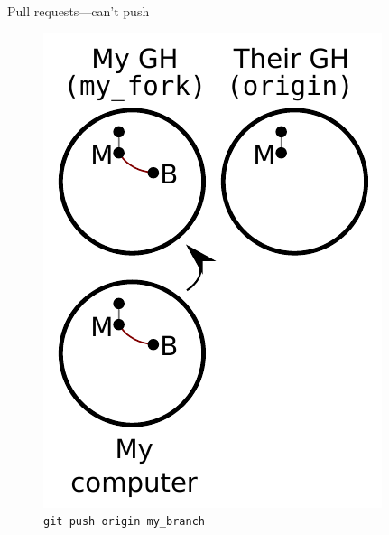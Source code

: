 \begin{frame}{Pull requests---can't push}
  \begin{figure}
    \includegraphics{fork_005.pdf}
    \\ \texttt{git push origin my\_branch}
    \\ \texttt{}
  \end{figure}
\end{frame}

